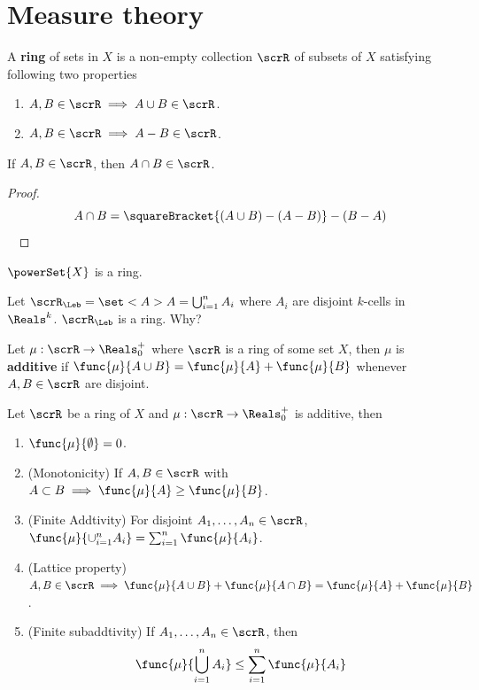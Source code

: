 \section{Measure theory}
\begin{definition}
    A \textbf{ring} of sets in \(X\) is a non-empty collection \(\scrR\) of subsets of \(X\) satisfying following two properties
    \begin{enumerate}
        \item \(A,B \in \scrR \implies A \cup B \in \scrR\).
        \item \(A,B \in \scrR \implies A - B \in \scrR\).
    \end{enumerate}
\end{definition}
\begin{lemma}
    If \(A,B \in \scrR\), then \(A \cap B \in \scrR\).
\end{lemma}
\begin{proof}
    \begin{equation*}
        A \cap B = \squareBracket{(A \cup B) - (A - B)} - (B - A)
    \end{equation*}
    \
\end{proof}
\begin{example}
    \(\powerSet{X}\) is a ring.
\end{example}

\begin{example}
    Let \(\scrR_{\Leb} = \set<A>{A = \bigcup_{i = 1}^n A_i}\) where \(A_i\) are disjoint \(k\)-cells in \(\Reals^k\). \(\scrR_{\Leb}\) is a ring. Why?
\end{example}

\begin{definition}
    Let \(\mu:\scrR \to \Reals^+_0\) where \(\scrR\) is a ring of some set \(X\), then \(\mu\) is \textbf{additive} if \(\func{\mu}{A \cup B} = \func{\mu}{A} + \func{\mu}{B}\) whenever \(A,B \in \scrR\) are disjoint.
\end{definition}

\begin{proposition}
    Let \(\scrR\) be a ring of \(X\) and \(\mu: \scrR \to \Reals^+_0\) is additive, then 
    \begin{enumerate}
        \item \(\func{\mu}{\emptyset} = 0\).
        \item (Monotonicity) If \(A,B \in \scrR\) with \(A \subset B \implies \func{\mu}{A} \geq \func{\mu}{B}\).
        \item (Finite Addtivity) For disjoint \(A_1, \dots , A_n \in \scrR\), \(\func{\mu}{\cup_{i = 1}^n A_i} = \sum_{i = 1}^n \func{\mu}{A_i}\).
        \item (Lattice property) \(A,B \in \scrR \implies \func{\mu}{A \cup B} + \func{\mu}{A \cap B} = \func{\mu}{A} + \func{\mu}{B}\).
        \item (Finite subaddtivity) If \(A_1, \dots , A_n \in \scrR\), then 
        \begin{equation*}
            \func{\mu}{\bigcup_{i = 1}^n A_i} \leq \sum_{i = 1}^n \func{\mu}{A_i}
        \end{equation*}
    \end{enumerate}
\end{proposition}


